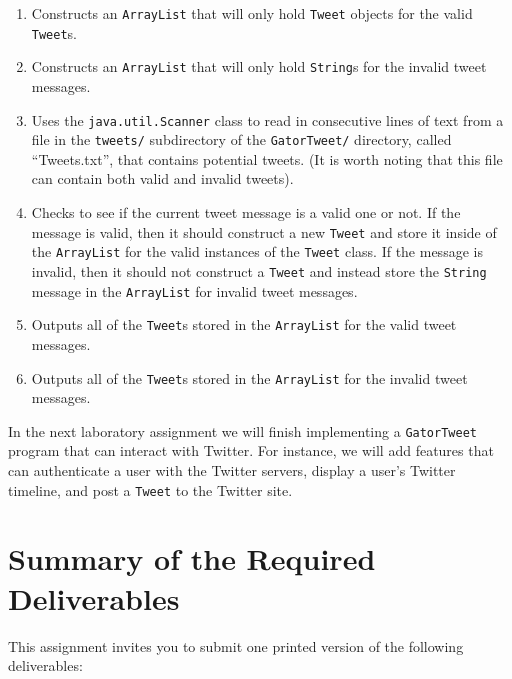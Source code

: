 \vspace*{-.1in} \begin{enumerate}
    \item Constructs an {\tt ArrayList} that will only hold {\tt Tweet} objects for the valid {\tt Tweet}s.

    \item Constructs an {\tt ArrayList} that will only hold {\tt String}s for the invalid tweet messages.

    \item Uses the {\tt java.util.Scanner} class to read in consecutive lines of text from a file in the {\tt tweets/}
      subdirectory of the {\tt GatorTweet/} directory, called ``Tweets.txt'', that contains potential tweets. (It is
      worth noting that this file can contain both valid and invalid tweets).

    \item Checks to see if the current tweet message is a valid one or not.  If the message is valid, then it should
      construct a new {\tt Tweet} and store it inside of the {\tt ArrayList} for the valid instances of the {\tt Tweet}
      class.  If the message is invalid, then it should not construct a {\tt Tweet} and instead store the {\tt String}
      message in the {\tt ArrayList} for invalid tweet messages.

    \item Outputs all of the {\tt Tweet}s stored in the {\tt ArrayList} for the valid tweet messages. 

    \item Outputs all of the {\tt Tweet}s stored in the {\tt ArrayList} for the invalid tweet messages. 

  \end{enumerate}

  In the next laboratory assignment we will finish implementing a {\tt GatorTweet} program that can interact with
  Twitter. For instance, we will add features that can authenticate a user with the Twitter servers, display a user's
  Twitter timeline, and post a {\tt Tweet} to the Twitter site.

\section*{Summary of the Required Deliverables}

  This assignment invites you to submit one printed version of the following deliverables: 

